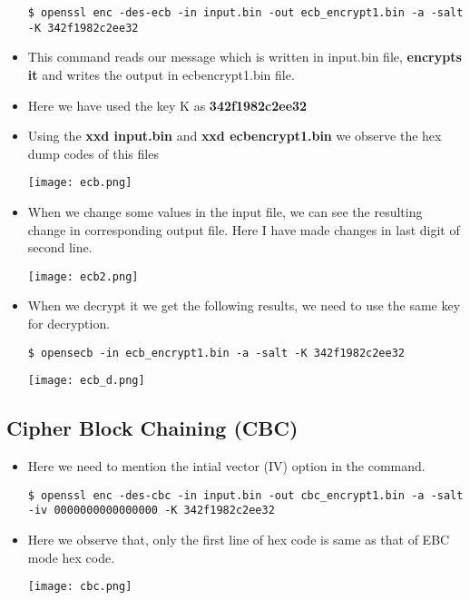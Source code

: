 \documentclass[12pt, a4]{article}
\begin{document}
\begin{itemize}
\begin{lstlisting}
$ openssl enc -des-ecb -in input.bin -out ecb_encrypt1.bin -a -salt -K 342f1982c2ee32
\end{lstlisting}
\item This command reads our message which is written in input.bin file, \textbf{encrypts it} and writes the output in ecbencrypt1.bin file.
\item Here we have used the key K as \textbf{342f1982c2ee32}
\item Using the \textbf{xxd input.bin} and \textbf{xxd ecbencrypt1.bin} we observe the hex dump codes of this files
\begin{center}
\texttt{[image: ecb.png]}
\end{center}

\item When we change some values in the input file, we can see the resulting change in corresponding output file. Here I have made changes in last digit of second line.
\begin{center}
\texttt{[image: ecb2.png]}
\end{center}
\item When we decrypt it we get the following results, we need to use the same key for decryption.
\begin{lstlisting}
$ opensecb -in ecb_encrypt1.bin -a -salt -K 342f1982c2ee32
\end{lstlisting}
\begin{center}
\texttt{[image: ecb\_d.png]}
\end{center}
\end{itemize}

\subsection{Cipher Block Chaining (CBC)}
\begin{itemize}
\item Here we need to mention the intial vector (IV) option in the command.
\begin{lstlisting}
$ openssl enc -des-cbc -in input.bin -out cbc_encrypt1.bin -a -salt -iv 0000000000000000 -K 342f1982c2ee32
\end{lstlisting}
\item Here we observe that, only the first line of hex code is same as that of EBC mode hex code.
\begin{center}
\texttt{[image: cbc.png]}
\end{center}
\end{itemize}
\end{document}
